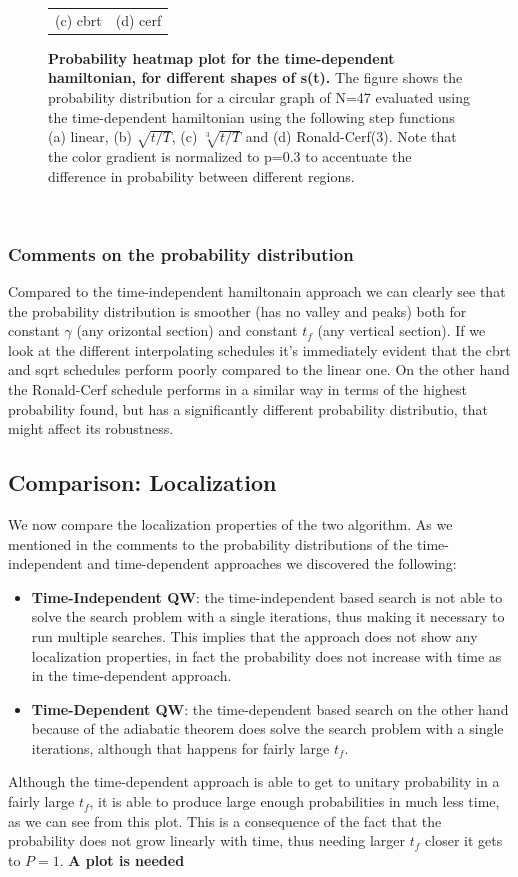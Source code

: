 \begin{figure}[ht]
\begin{tabular}{cc}
        (c) cbrt & (d) cerf\\[6pt]
        \end{tabular}
        \caption[Probability heatmap plot for the time-dependent hamiltonian, for different shapes of s(t)]{\textbf{Probability heatmap plot for the time-dependent hamiltonian, for different shapes of s(t).} The figure shows the probability distribution for a circular graph of N=47 evaluated using the time-dependent hamiltonian using the following step functions (a) linear, (b) $\sqrt{t/T}$, (c) $\sqrt[3]{t/T}$ and (d) Ronald-Cerf(3). Note that the color gradient is normalized to p=0.3 to accentuate the difference in probability between different regions. }
        \label{time_dependent_heatmap}
        \end{figure}\\
        \subsubsection*{Comments on the probability distribution}
        Compared to the time-independent hamiltonain approach we can clearly see that the probability distribution is smoother (has no valley and peaks) both for constant $\gamma$ (any orizontal section) and constant $t_f$ (any vertical section). If we look at the different interpolating schedules it's immediately evident that the cbrt and sqrt schedules perform poorly compared to the linear one. On the other hand the Ronald-Cerf schedule performs in a similar way in terms of the highest probability found, but has a significantly different probability distributio, that might affect its robustness.
        \clearpage
    \subsection{Comparison: Localization}
        We now compare the localization properties of the two algorithm. As we mentioned in the comments to the probability distributions of the time-independent and time-dependent approaches we discovered the following:
        \begin{itemize}
            \item \textbf{Time-Independent QW}: the time-independent based search is not able to solve the search problem with a single iterations, thus making it necessary to run multiple searches. This implies that the approach does not show any localization properties, in fact the probability does not increase with time as in the time-dependent approach.
            \item \textbf{Time-Dependent QW}: the time-dependent based search on the other hand because of the adiabatic theorem does solve the search problem with a single iterations, although that happens for fairly large $t_f$.
        \end{itemize}
        Although the time-dependent approach is able to get to unitary probability in a fairly large $t_f$, it is able to produce large enough probabilities in much less time, as we can see from this plot. This is a consequence of the fact that the probability does not grow linearly with time, thus needing larger $t_f$ closer it gets to $P=1$. \textbf{A plot is needed}


